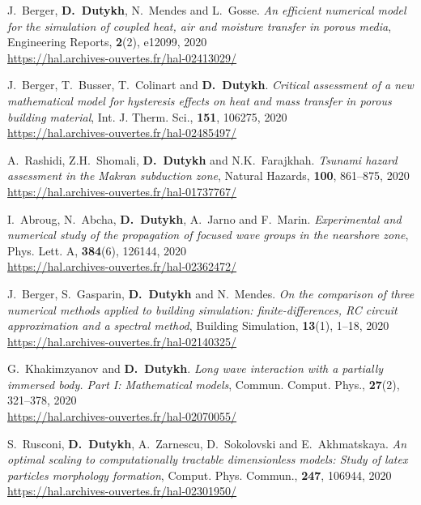 \begin{etaremune}
  \item J.~Berger, \textbf{D.~Dutykh}, N.~Mendes and L.~Gosse. \textit{An efficient numerical model for the simulation of coupled heat, air and moisture transfer in porous media}, Engineering Reports, \textbf{2}(2), e12099, 2020 \\ %
  \url{https://hal.archives-ouvertes.fr/hal-02413029/}
  
  \item J.~Berger, T.~Busser, T.~Colinart and \textbf{D.~Dutykh}. \textit{Critical assessment of a new mathematical model for hysteresis effects on heat and mass transfer in porous building material}, Int. J. Therm. Sci., \textbf{151}, 106275, 2020 \\ %
  \url{https://hal.archives-ouvertes.fr/hal-02485497/}
  
  \item A.~Rashidi, Z.H.~Shomali, \textbf{D.~Dutykh} and N.K.~Farajkhah. \textit{Tsunami hazard assessment in the Makran subduction zone}, Natural Hazards, \textbf{100}, 861--875, 2020 \\ %
  \url{https://hal.archives-ouvertes.fr/hal-01737767/}
  
  \item I.~Abroug, N.~Abcha, \textbf{D.~Dutykh}, A.~Jarno and F.~Marin. \textit{Experimental and numerical study of the propagation of focused wave groups in the nearshore zone}, Phys. Lett. A, \textbf{384}(6), 126144, 2020 \\ %
  \url{https://hal.archives-ouvertes.fr/hal-02362472/}
  
  \item J.~Berger, S.~Gasparin, \textbf{D.~Dutykh} and N.~Mendes. \textit{On the comparison of three numerical methods applied to building simulation: finite-differences, RC circuit approximation and a spectral method}, Building Simulation, \textbf{13}(1), 1--18, 2020 \\ %
  \url{https://hal.archives-ouvertes.fr/hal-02140325/}
  
  \item G.~Khakimzyanov and \textbf{D.~Dutykh}. \textit{Long wave interaction with a partially immersed body. Part I: Mathematical models}, Commun. Comput. Phys., \textbf{27}(2), 321--378, 2020 \\ %
  \url{https://hal.archives-ouvertes.fr/hal-02070055/}
  
  \item S.~Rusconi, \textbf{D.~Dutykh}, A.~Zarnescu, D.~Sokolovski and E.~Akhmatskaya. \textit{An optimal scaling to computationally tractable dimensionless models: Study of latex particles morphology formation}, Comput. Phys. Commun., \textbf{247}, 106944, 2020 \\ %
  \url{https://hal.archives-ouvertes.fr/hal-02301950/}
  

\end{etaremune}
